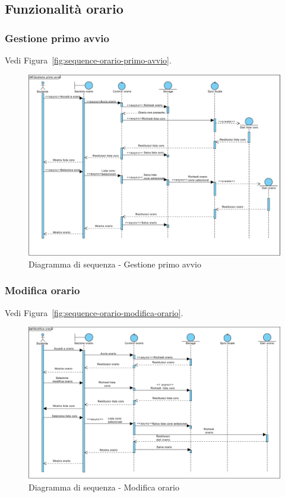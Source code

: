 \subsection{Funzionalità orario}

\subsubsection{Gestione primo avvio}

Vedi Figura~\vref{fig:sequence-orario-primo-avvio}.

\begin{figure}[h]
	\centering
	\includegraphics[width=\textwidth]{imgs/gruppo2/sequence-orario-primo-avvio.pdf}
	\caption{Diagramma di sequenza - Gestione primo avvio}
	\label{fig:sequence-orario-primo-avvio}
\end{figure}

\subsubsection{Modifica orario}

Vedi Figura~\vref{fig:sequence-orario-modifica-orario}.

\begin{figure}
	\centering
	\includegraphics[width=\textwidth]{imgs/gruppo2/sequence-orario-modifica-orario.pdf}
	\caption{Diagramma di sequenza - Modifica orario}
	\label{fig:sequence-orario-modifica-orario}
\end{figure}

